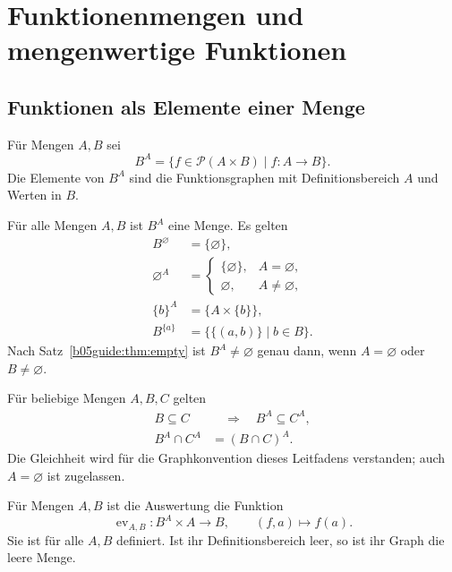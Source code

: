 \chapter{Funktionenmengen und mengenwertige Funktionen}
\label{b05guide:ch:functionsets}

\section{Funktionen als Elemente einer Menge}

\begin{definition}[Funktionenmenge]
Für Mengen $A,B$ sei
\[
 B^A=\{f\in\mathcal P(A\times B)\mid f\colon A\to B\}.
\]
Die Elemente von $B^A$ sind die Funktionsgraphen mit
Definitionsbereich $A$ und Werten in $B$.
\end{definition}

\begin{theorem}
\label{b05guide:thm:functionset}
Für alle Mengen $A,B$ ist $B^A$ eine Menge. Es gelten
\[
 \begin{aligned}
 B^{\varnothing}&=\{\varnothing\},\\
 \varnothing^A&=
 \begin{cases}
  \{\varnothing\},&A=\varnothing,\\
  \varnothing,&A\ne\varnothing,
 \end{cases}\\
 \{b\}^A&=\{A\times\{b\}\},\\
 B^{\{a\}}&=\bigl\{\{(a,b)\}\mid b\in B\bigr\}.
 \end{aligned}
\]
Nach Satz~\ref{b05guide:thm:empty} ist $B^A\ne\varnothing$
genau dann, wenn $A=\varnothing$ oder $B\ne\varnothing$.
\end{theorem}

\begin{theorem}
Für beliebige Mengen $A,B,C$ gelten
\[
 \begin{aligned}
 B\subseteq C&\quad\Longrightarrow\quad B^A\subseteq C^A,\\
 B^A\cap C^A&=(B\cap C)^A.
 \end{aligned}
\]
Die Gleichheit wird für die Graphkonvention dieses Leitfadens
verstanden; auch $A=\varnothing$ ist zugelassen.
\end{theorem}

\begin{definition}[Auswertungsfunktion]
Für Mengen $A,B$ ist die Auswertung die Funktion
\[
 \operatorname{ev}_{A,B}\colon B^A\times A\to B,
 \qquad (f,a)\mapsto f(a).
\]
Sie ist für alle $A,B$ definiert. Ist ihr Definitionsbereich leer,
so ist ihr Graph die leere Menge.
\end{definition}

